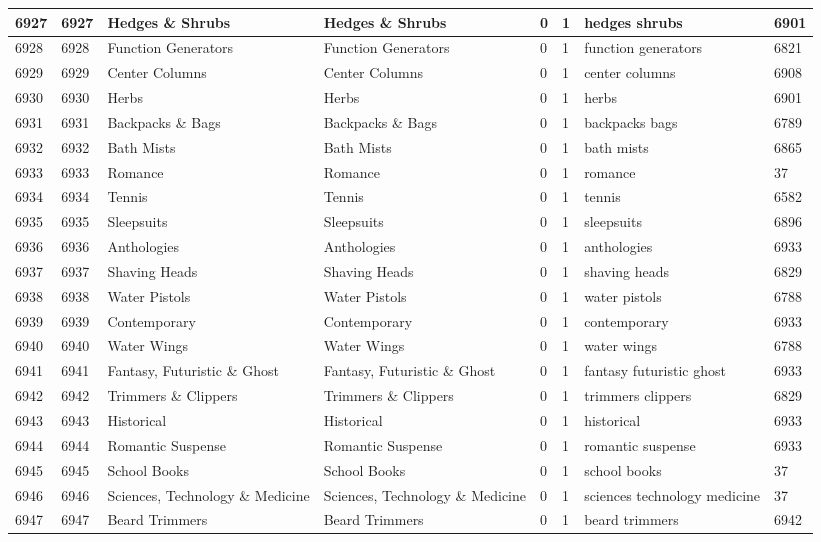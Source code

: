 \begin{longtable}{|l|l|l|l|l|l|l|l|}
6927 & 6927 & Hedges \& Shrubs & Hedges \& Shrubs & 0 & 1 & hedges shrubs & 6901 \\ \hline 
6928 & 6928 & Function Generators & Function Generators & 0 & 1 & function generators & 6821 \\ \hline 
6929 & 6929 & Center Columns & Center Columns & 0 & 1 & center columns & 6908 \\ \hline 
6930 & 6930 & Herbs & Herbs & 0 & 1 & herbs & 6901 \\ \hline 
6931 & 6931 & Backpacks \& Bags & Backpacks \& Bags & 0 & 1 & backpacks bags & 6789 \\ \hline 
6932 & 6932 & Bath Mists & Bath Mists & 0 & 1 & bath mists & 6865 \\ \hline 
6933 & 6933 & Romance & Romance & 0 & 1 & romance & 37 \\ \hline 
6934 & 6934 & Tennis & Tennis & 0 & 1 & tennis & 6582 \\ \hline 
6935 & 6935 & Sleepsuits & Sleepsuits & 0 & 1 & sleepsuits & 6896 \\ \hline 
6936 & 6936 & Anthologies & Anthologies & 0 & 1 & anthologies & 6933 \\ \hline 
6937 & 6937 & Shaving Heads & Shaving Heads & 0 & 1 & shaving heads & 6829 \\ \hline 
6938 & 6938 & Water Pistols & Water Pistols & 0 & 1 & water pistols & 6788 \\ \hline 
6939 & 6939 & Contemporary & Contemporary & 0 & 1 & contemporary & 6933 \\ \hline 
6940 & 6940 & Water Wings & Water Wings & 0 & 1 & water wings & 6788 \\ \hline 
6941 & 6941 & Fantasy, Futuristic \& Ghost & Fantasy, Futuristic \& Ghost & 0 & 1 & fantasy futuristic ghost & 6933 \\ \hline 
6942 & 6942 & Trimmers \& Clippers & Trimmers \& Clippers & 0 & 1 & trimmers clippers & 6829 \\ \hline 
6943 & 6943 & Historical & Historical & 0 & 1 & historical & 6933 \\ \hline 
6944 & 6944 & Romantic Suspense & Romantic Suspense & 0 & 1 & romantic suspense & 6933 \\ \hline 
6945 & 6945 & School Books & School Books & 0 & 1 & school books & 37 \\ \hline 
6946 & 6946 & Sciences, Technology \& Medicine & Sciences, Technology \& Medicine & 0 & 1 & sciences technology medicine & 37 \\ \hline 
6947 & 6947 & Beard Trimmers & Beard Trimmers & 0 & 1 & beard trimmers & 6942 \\ \hline 

\end{longtable}
